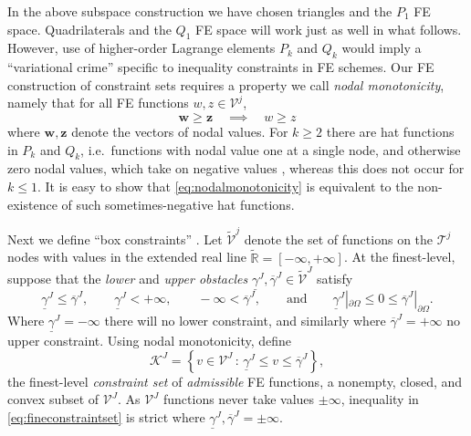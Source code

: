 \documentclass[letterpaper,final,12pt,reqno]{amsart}
\theoremstyle{cstyle}
\theoremstyle{cstyle*}
\theoremstyle{dstyle}
\numberwithin{equation}{section}
\numberwithin{figure}{section}
\numberwithin{table}{section}
\numberwithin{theorem}{section}
\newcommand{\RR}{\mathbb{R}}
\newcommand{\bw}{\mathbf{w}}
\newcommand{\bz}{\mathbf{z}}
\begin{document}
In the above subspace construction we have chosen triangles and the $P_1$ FE space.  Quadrilaterals and the $Q_1$ FE space will work just as well in what follows.  However, use of higher-order Lagrange elements $P_k$ and $Q_k$ would imply a ``variational crime'' \cite[Chapter 10]{BrennerScott2007} specific to inequality constraints in FE schemes.  Our FE construction of constraint sets requires a property we call \emph{nodal monotonicity}, namely that for all FE functions $w,z \in \mathcal{V}^j$,
\begin{equation}
\bw \ge \bz \quad \implies \quad w \ge z \label{eq:nodalmonotonicity}
\end{equation}
where $\bw,\bz$ denote the vectors of nodal values.  For $k\ge 2$ there are hat functions in $P_k$ and $Q_k$, i.e.~functions with nodal value one at a single node, and otherwise zero nodal values, which take on negative values \cite[Figure 1.7]{Elmanetal2014}, whereas this does not occur for $k\le 1$.  It is easy to show that \eqref{eq:nodalmonotonicity} is equivalent to the non-existence of such sometimes-negative hat functions.

Next we define ``box constraints'' \cite{BensonMunson2006}.  Let $\tilde{\mathcal{V}}^j$ denote the set of functions on the $\mathcal{T}^j$ nodes with values in the extended real line $\tilde{\RR} = [-\infty,+\infty]$.  At the finest-level, suppose that the \emph{lower} and \emph{upper obstacles} $\underline{\gamma}^J, \overline{\gamma}^J \in \tilde{\mathcal{V}}^J$ satisfy
\begin{equation}
\underline{\gamma}^J \le \overline{\gamma}^J, \qquad \underline{\gamma}^J < +\infty, \qquad -\infty < \overline{\gamma}^J, \qquad \text{and} \qquad \underline{\gamma}^J|_{\partial\Omega} \le 0 \le \overline{\gamma}^J|_{\partial\Omega}. \label{eq:fe:boxconstraintrequirements}
\end{equation}
Where $\underline{\gamma}^J=-\infty$ there will no lower constraint, and similarly where $\overline{\gamma}^J=+\infty$ no upper constraint.  Using nodal monotonicity, define
\begin{equation}
\mathcal{K}^J = \left\{v \in \mathcal{V}^J\,:\,\underline{\gamma}^J \le v \le \overline{\gamma}^J\right\}, \label{eq:fineconstraintset}
\end{equation}
the finest-level \emph{constraint set} of \emph{admissible} FE functions, a nonempty, closed, and convex subset of $\mathcal{V}^J$.  As $\mathcal{V}^J$ functions never take values $\pm\infty$, inequality in \eqref{eq:fineconstraintset} is strict where $\underline{\gamma}^J, \overline{\gamma}^J = \pm \infty$.
\end{document}
